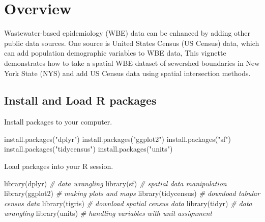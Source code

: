 \documentclass[
]{book}
\newenvironment{Shaded}{\begin{snugshade}}{\end{snugshade}}
\newcommand{\CommentTok}[1]{\textcolor[rgb]{0.56,0.35,0.01}{\textit{#1}}}
\newcommand{\FunctionTok}[1]{\textcolor[rgb]{0.00,0.00,0.00}{#1}}
\newcommand{\NormalTok}[1]{#1}
\newcommand{\StringTok}[1]{\textcolor[rgb]{0.31,0.60,0.02}{#1}}
\begin{document}
\hypertarget{overview-1}{%
\section{Overview}\label{overview-1}}

Wastewater-based epidemiology (WBE) data can be enhanced by adding other public data sources. One source is United States Census (US Census) data, which can add population demographic variables to WBE data, This vignette demonstrates how to take a spatial WBE dataset of sewershed boundaries in New York State (NYS) and add US Census data using spatial intersection methods.

\hypertarget{install-and-load-r-packages}{%
\subsection{Install and Load R packages}\label{install-and-load-r-packages}}

Install packages to your computer.

\begin{Shaded}
\begin{Highlighting}[]
\FunctionTok{install.packages}\NormalTok{(}\StringTok{"dplyr"}\NormalTok{)}
\FunctionTok{install.packages}\NormalTok{(}\StringTok{"ggplot2"}\NormalTok{)}
\FunctionTok{install.packages}\NormalTok{(}\StringTok{"sf"}\NormalTok{)}
\FunctionTok{install.packages}\NormalTok{(}\StringTok{"tidycensus"}\NormalTok{)}
\FunctionTok{install.packages}\NormalTok{(}\StringTok{"units"}\NormalTok{)}
\end{Highlighting}
\end{Shaded}

Load packages into your R session.

\begin{Shaded}
\begin{Highlighting}[]
\FunctionTok{library}\NormalTok{(dplyr) }\CommentTok{\# data wrangling}
\FunctionTok{library}\NormalTok{(sf) }\CommentTok{\# spatial data manipulation}
\FunctionTok{library}\NormalTok{(ggplot2) }\CommentTok{\# making plots and maps}
\FunctionTok{library}\NormalTok{(tidycensus) }\CommentTok{\# download tabular census data}
\FunctionTok{library}\NormalTok{(tigris) }\CommentTok{\# download spatial census data}
\FunctionTok{library}\NormalTok{(tidyr) }\CommentTok{\# data wrangling}
\FunctionTok{library}\NormalTok{(units) }\CommentTok{\# handling variables with unit assignment}
\end{Highlighting}
\end{Shaded}
\end{document}
